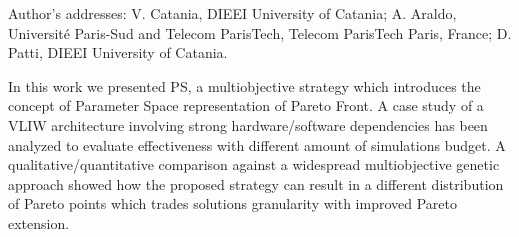 \documentclass[prodmode,acmtecs]{acmsmall}
\newcommand{\secL}[1]{\label{sec:#1}}
\begin{document}




\begin{bottomstuff}
Author's addresses: V. Catania, DIEEI University of Catania;
A. Araldo, Universit\'e Paris-Sud and Telecom ParisTech, Telecom ParisTech
Paris, France;
D. Patti, DIEEI University of Catania.
\end{bottomstuff}

\maketitle





\secL{Conclusions}
In this work we presented PS, a multiobjective strategy which 
introduces the concept of Parameter Space representation of Pareto
Front. A case study of a VLIW architecture involving strong
hardware/software dependencies has been analyzed to evaluate
effectiveness with different amount of simulations budget.
A qualitative/quantitative comparison against a widespread multiobjective genetic
approach showed how the proposed strategy can result in a different
distribution of Pareto points which trades solutions granularity with
improved Pareto extension. 

\balance

 


\end{document}
